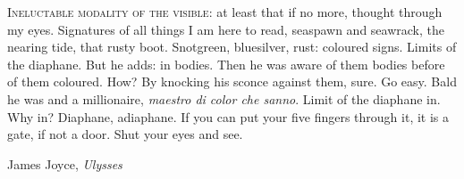 \epigraph{\textsc{Ineluctable modality of the visible}: at least that if no more, thought through my eyes. Signatures of all things I am here to read, seaspawn and seawrack, the nearing tide, that rusty boot. Snotgreen, bluesilver, rust: coloured signs. Limits of the diaphane. But he adds: in bodies. Then he was aware of them bodies before of them coloured. How? By knocking his sconce against them, sure. Go easy. Bald he was and a millionaire, \emph{maestro di color che sanno}. Limit of the diaphane in. Why in? Diaphane, adiaphane. If you can put your five fingers through it, it is a gate, if not a door. Shut your eyes and see.}{James Joyce, \emph{Ulysses}}